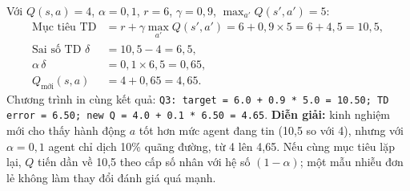 \documentclass[12pt,a4paper]{report}
\begin{document}
Với $Q(s,a)=4$, $\alpha=0{,}1$, $r=6$, $\gamma=0{,}9$, $\max_{a'}Q(s',a')=5$:
\begin{align*}
\text{Mục tiêu TD} &= r+\gamma\max_{a'}Q(s',a')=6+0{,}9\times5=6+4{,}5=10{,}5,\\
\text{Sai số TD } \delta &= 10{,}5-4=6{,}5,\\
\alpha\,\delta &= 0{,}1\times6{,}5=0{,}65,\\
Q_{\text{mới}}(s,a) &= 4+0{,}65=4{,}65.
\end{align*}
Chương trình in cùng kết quả: \texttt{Q3: target = 6.0 + 0.9 * 5.0 = 10.50; TD
error = 6.50; new Q = 4.0 + 0.1 * 6.50 = 4.65}. \textbf{Diễn giải:} kinh nghiệm mới
cho thấy hành động $a$ tốt hơn mức agent đang tin (10{,}5 so với 4), nhưng với
$\alpha=0{,}1$ agent chỉ dịch 10\% quãng đường, từ 4 lên 4{,}65. Nếu cùng mục tiêu
lặp lại, $Q$ tiến dần về 10{,}5 theo cấp số nhân với hệ số $(1-\alpha)$; một mẫu
nhiễu đơn lẻ không làm thay đổi đánh giá quá mạnh.

\end{document}
